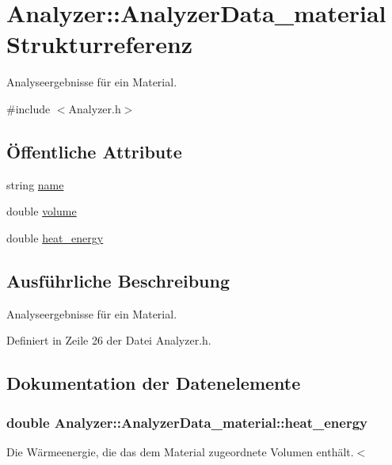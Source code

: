 \hypertarget{structAnalyzer_1_1AnalyzerData__material}{\section{Analyzer\-:\-:Analyzer\-Data\-\_\-material Strukturreferenz}
\label{structAnalyzer_1_1AnalyzerData__material}
}


Analyseergebnisse für ein Material.  




{\ttfamily \#include $<$Analyzer.\-h$>$}

\subsection*{Öffentliche Attribute}
\begin{DoxyCompactItemize}
\item 
string \hyperlink{structAnalyzer_1_1AnalyzerData__material_a0a6b01fc900ce677ae8403d3a85b829b}{name}
\item 
double \hyperlink{structAnalyzer_1_1AnalyzerData__material_a20017730ff899b65f91aa30caaf35dd6}{volume}
\item 
double \hyperlink{structAnalyzer_1_1AnalyzerData__material_a94efc7f38f7f59c97a48a0155f9c4719}{heat\-\_\-energy}
\end{DoxyCompactItemize}


\subsection{Ausführliche Beschreibung}
Analyseergebnisse für ein Material. 

Definiert in Zeile 26 der Datei Analyzer.\-h.



\subsection{Dokumentation der Datenelemente}
\hypertarget{structAnalyzer_1_1AnalyzerData__material_a94efc7f38f7f59c97a48a0155f9c4719}{
\subsubsection[{heat\-\_\-energy}]{\setlength{\rightskip}{0pt plus 5cm}double Analyzer\-::\-Analyzer\-Data\-\_\-material\-::heat\-\_\-energy}}\label{structAnalyzer_1_1AnalyzerData__material_a94efc7f38f7f59c97a48a0155f9c4719}
Die Wärmeenergie, die das dem Material zugeordnete Volumen enthält.$<$ 

